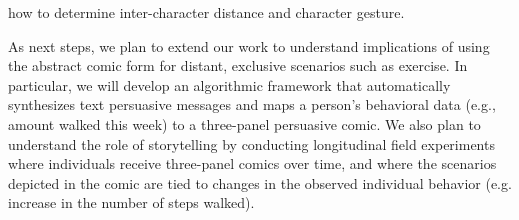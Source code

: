 how to determine inter-character distance and character gesture. 

As next steps, we plan to extend our work to understand implications of using the abstract comic form for distant, exclusive scenarios such as exercise. In particular, we will develop an algorithmic framework that automatically synthesizes text persuasive messages and maps a person's behavioral data (e.g., amount walked this week) to a three-panel persuasive comic. We also plan to understand the role of storytelling by conducting longitudinal field experiments where individuals receive three-panel comics over time, and where the scenarios depicted in the comic are tied to changes in the observed individual behavior (e.g. increase in the number of steps walked). 







